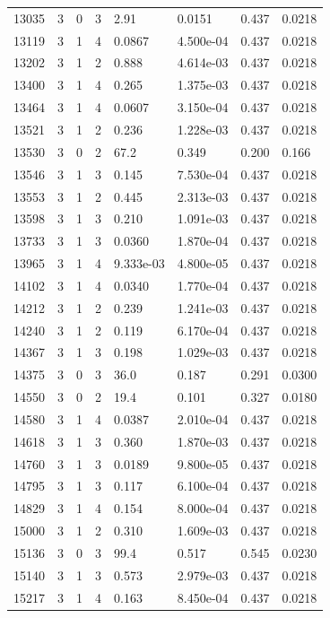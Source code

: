 \documentclass[preview]{standalone}
\begin{document}
{{{{\begin{tabular}{L{1.2cm}C{1.2cm} C{0.3cm}C{0.5cm} C{1.4cm}C{1.4cm} C{1.4cm}C{1.4cm}}
  13035  &     3  & 0     &  3 &  2.91  & 0.0151  & 0.437 &  0.0218   \\ 
  13119  &     3  & 1     &  4 &  0.0867  & 4.500e-04  & 0.437 &  0.0218   \\ 
  13202  &     3  & 1     &  2 &  0.888  & 4.614e-03  & 0.437 &  0.0218   \\ 
  13400  &     3  & 1     &  4 &  0.265  & 1.375e-03  & 0.437 &  0.0218   \\ 
  13464  &     3  & 1     &  4 &  0.0607  & 3.150e-04  & 0.437 &  0.0218   \\ 
  13521  &     3  & 1     &  2 &  0.236  & 1.228e-03  & 0.437 &  0.0218   \\ 
  13530  &     3  & 0     &  2 &  67.2  & 0.349  & 0.200 &  0.166   \\ 
  13546  &     3  & 1     &  3 &  0.145  & 7.530e-04  & 0.437 &  0.0218   \\ 
  13553  &     3  & 1     &  2 &  0.445  & 2.313e-03  & 0.437 &  0.0218   \\ 
  13598  &     3  & 1     &  3 &  0.210  & 1.091e-03  & 0.437 &  0.0218   \\ 
  13733  &     3  & 1     &  3 &  0.0360  & 1.870e-04  & 0.437 &  0.0218   \\ 
  13965  &     3  & 1     &  4 &  9.333e-03  & 4.800e-05  & 0.437 &  0.0218   \\ 
  14102  &     3  & 1     &  4 &  0.0340  & 1.770e-04  & 0.437 &  0.0218   \\ 
  14212  &     3  & 1     &  2 &  0.239  & 1.241e-03  & 0.437 &  0.0218   \\ 
  14240  &     3  & 1     &  2 &  0.119  & 6.170e-04  & 0.437 &  0.0218   \\ 
  14367  &     3  & 1     &  3 &  0.198  & 1.029e-03  & 0.437 &  0.0218   \\ 
  14375  &     3  & 0     &  3 &  36.0  & 0.187  & 0.291 &  0.0300   \\ 
  14550  &     3  & 0     &  2 &  19.4  & 0.101  & 0.327 &  0.0180   \\ 
  14580  &     3  & 1     &  4 &  0.0387  & 2.010e-04  & 0.437 &  0.0218   \\ 
  14618  &     3  & 1     &  3 &  0.360  & 1.870e-03  & 0.437 &  0.0218   \\ 
  14760  &     3  & 1     &  3 &  0.0189  & 9.800e-05  & 0.437 &  0.0218   \\ 
  14795  &     3  & 1     &  3 &  0.117  & 6.100e-04  & 0.437 &  0.0218   \\ 
  14829  &     3  & 1     &  4 &  0.154  & 8.000e-04  & 0.437 &  0.0218   \\ 
  15000  &     3  & 1     &  2 &  0.310  & 1.609e-03  & 0.437 &  0.0218   \\ 
  15136  &     3  & 0     &  3 &  99.4  & 0.517  & 0.545 &  0.0230   \\ 
  15140  &     3  & 1     &  3 &  0.573  & 2.979e-03  & 0.437 &  0.0218   \\ 
  15217  &     3  & 1     &  4 &  0.163  & 8.450e-04  & 0.437 &  0.0218   \\ 
\hline 
\end{tabular} 

}}}}
\end{document}
